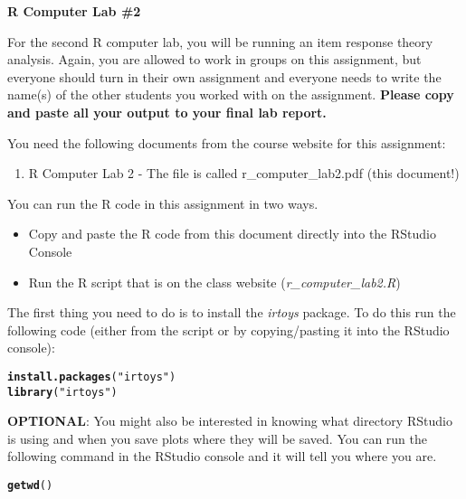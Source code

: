 \documentclass{article}\usepackage[]{graphicx}\usepackage[]{color}
\makeatletter
\newcommand{\hlstr}[1]{\textcolor[rgb]{0.192,0.494,0.8}{#1}}%
\newcommand{\hlstd}[1]{\textcolor[rgb]{0.345,0.345,0.345}{#1}}%
\newcommand{\hlkwd}[1]{\textcolor[rgb]{0.737,0.353,0.396}{\textbf{#1}}}%
\newenvironment{kframe}{%
 \def\at@end@of@kframe{}%
 \ifinner\ifhmode%
  \def\at@end@of@kframe{\end{minipage}}%
  \begin{minipage}{\columnwidth}%
 \fi\fi%
 \def\FrameCommand##1{\hskip\@totalleftmargin \hskip-\fboxsep
 \colorbox{shadecolor}{##1}\hskip-\fboxsep
     \hskip-\linewidth \hskip-\@totalleftmargin \hskip\columnwidth}%
 \MakeFramed {\advance\hsize-\width
   \@totalleftmargin\z@ \linewidth\hsize
   \@setminipage}}%
 {\par\unskip\endMakeFramed%
 \at@end@of@kframe}
\newenvironment{knitrout}{}{} %
\makeatother
\begin{document}
\begin{center}
{\large \textbf{R Computer Lab \#2}}
\end{center}

For the second R computer lab, you will be running an item response theory analysis. Again, you are allowed to work in groups on this assignment, but everyone should turn in their own assignment and everyone needs to write the name(s) of the other students you worked with on the assignment. \textbf{Please copy and paste all your output to your final lab report.}  

\vspace{.2cm}
You need the following documents from the course website for this assignment:
\begin{enumerate}
\item R Computer Lab 2 - The file is called r\_computer\_lab2.pdf (this document!)
\end{enumerate}

\vspace{.2cm}
You can run the R code in this assignment in two ways.

\begin{itemize}
  \item Copy and paste the R code from this document directly into the RStudio Console
  \item Run the R script that is on the class website (\textit{r\_computer\_lab2.R})
\end{itemize}

The first thing you need to do is to install the \textit{irtoys} package. To do this run the following code (either from the script or by copying/pasting it into the RStudio console):
\begin{knitrout}
\color{fgcolor}\begin{kframe}
\begin{alltt}
\hlkwd{install.packages}\hlstd{(}\hlstr{"irtoys"}\hlstd{)}
\hlkwd{library}\hlstd{(}\hlstr{"irtoys"}\hlstd{)}
\end{alltt}
\end{kframe}
\end{knitrout}

\textbf{OPTIONAL}: You might also be interested in knowing what directory RStudio is using and when you save plots where they will be saved. You can run the following command in the RStudio console and it will tell you where you are.

\begin{knitrout}
\color{fgcolor}\begin{kframe}
\begin{alltt}
\hlkwd{getwd}\hlstd{()}
\end{alltt}
\end{kframe}
\end{knitrout}
\end{document}
